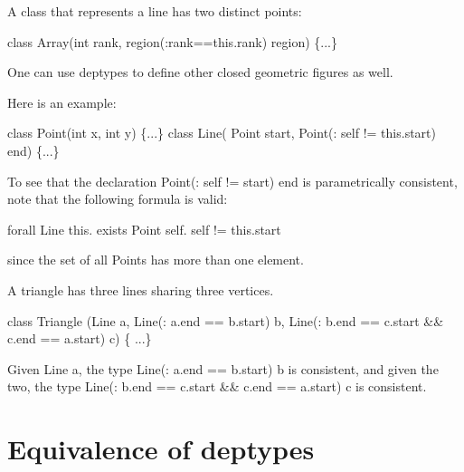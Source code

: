 \begin{example}

A class that represents a line has two distinct points:
\begin{x10}
class Array(int  rank, 
    region(:rank==this.rank) region) \{...\}  
\end{x10}
\end{example}

One can use deptypes to define other closed geometric figures as well.

\begin{example}
Here is an example:
\begin{x10}
 class Point(int x, int y) \{...\}
 class Line( Point start, 
        Point(: self != this.start) end) 
\{...\}      
\end{x10}
\end{example}


To see that the declaration {\cf Point(: self != start) end} is
parametrically consistent, note that the following formula is valid:
\begin{x10}
forall Line this. 
  exists Point self. self != this.start  
\end{x10}
\noindent since the set of all {\cf Points} has more than one element.

\begin{example}
A triangle has three lines sharing three vertices.
\begin{x10}
class Triangle 
 (Line a, 
  Line(: a.end == b.start) b, 
  Line(: b.end == c.start \&\& c.end == a.start) c) 
 \{ ...\}
\end{x10}
\end{example}


Given {\cf Line a}, the type {\cf Line(: a.end == b.start) b} is consistent, and
given the two, the type {\cf Line(: b.end == c.start \&\& c.end == a.start) c}
is consistent.


\section{Equivalence of deptypes}\label{DepType:Equivalence}\label{deptype,equivalence}

